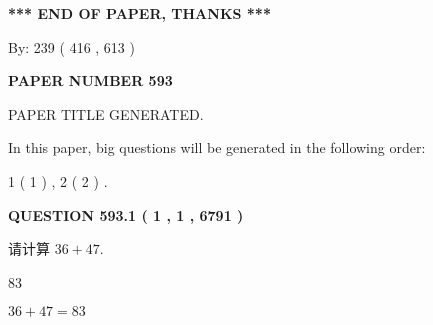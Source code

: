 \documentclass{ctexart}
\begin{document}
   
   
   
\vspace{1.0in} 
{\textbf{\large{ *** END OF PAPER, THANKS *** }}} 
   
   
\hspace{1.0in} By: 
 239 ( 416 ,  613 )
   
   
   
   
\newpage 
\setcounter{page}{ 
   593001 } 
   
   
   
   
 {\textbf{ \Large{ PAPER NUMBER  593  }}}
   
   
\vspace{0.2in}
   
   
   
   
   
   
   
   
 \vspace{0.2in}
 
 
 
 
   
   
 PAPER TITLE GENERATED.
   
   
   
\vspace{0.2in}
   
In this paper, big questions will be generated in the following order: 
   
   
   1 ( 1 )
 ,
   2 ( 2 )
 .
  
\vspace{0.2in}
  
{\textbf{\Large{QUESTION
593.1 
 ( 1 , 1 , 6791 )
}}}
  
  
 
请计算 $ %
36 +  %
47 $.
 
 
 
\noindent{}
 
 

83
 
 
\noindent{}
 
 

 
 
 
\noindent{}
 
 

$ %
36 +  %
47=   %
83$
 
\end{document}
